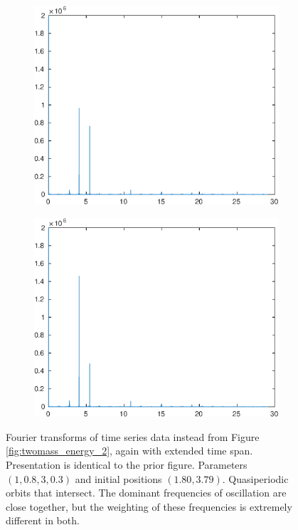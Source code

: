 \documentclass{report}
\begin{document}
\begin{figure}
    \begin{subfigure}[b]{0.5\textwidth}
        \includegraphics[width=\textwidth]{voiced_sounds/case_2/other_stable_resulta.eps}
    \end{subfigure}
    \begin{subfigure}[b]{0.5\textwidth}
        \includegraphics[width=\textwidth]{voiced_sounds/case_2/other_stable_resultb.eps}
    \end{subfigure} %
    \caption{
        Fourier transforms of time series data instead from Figure \ref{fig:twomass_energy_2}, again with extended time span.
        Presentation is identical to the prior figure.
        Parameters \((1, 0.8, 3, 0.3)\) and initial positions $(1.80,3.79)$.
        Quasiperiodic orbits that intersect.
        The dominant frequencies of oscillation are close together,
        but the weighting of these frequencies is extremely different in both.
    }
    \label{fig:twomass_fourier_second}
\end{figure}
\end{document}
